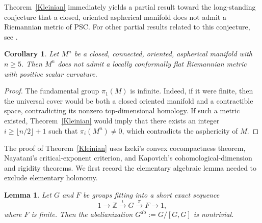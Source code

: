 \documentclass[12pt,oneside,a4paper]{article}
\theoremstyle{mytheorem}
\newtheorem{lemma}[definition]{Lemma}
\newtheorem{corollary}[definition]{Corollary}
\theoremstyle{remark}
\theoremstyle{definition}
\begin{document}
Theorem~\ref{Kleinian} immediately yields a partial result toward the long-standing conjecture that a closed, oriented aspherical manifold does not admit a Riemannian metric of PSC.
For other partial results related to this conjecture, see \cite{zbMATH07375613}.


\begin{corollary}\label{LCF aspherical}
Let \( M^n \) be a closed, connected, oriented, aspherical manifold with \( n \geq 5 \).
Then \( M^n \) does not admit a locally conformally flat Riemannian metric with positive scalar curvature.
\end{corollary}

\begin{proof}
The fundamental group \(\pi_1(M)\) is infinite. Indeed, if it were finite,
then the universal cover would be both a closed oriented manifold and a
contractible space, contradicting its nonzero top-dimensional homology.
If such a metric existed, Theorem~\ref{Kleinian} would imply that there exists
an integer $i\geq\lfloor n/2\rfloor+1$ such that
\(\pi_i(M^n)\neq0\), which contradicts the asphericity of \(M\).
\end{proof}



The proof of Theorem~\ref{Kleinian} uses Izeki's convex cocompactness theorem, Nayatani's critical-exponent criterion, and Kapovich's cohomological-dimension and rigidity theorems. We first record the elementary algebraic lemma needed to exclude elementary holonomy.

\begin{lemma}\label{Abel}
Let $G$ and $F$ be groups fitting into a short exact sequence
\[
1 \longrightarrow \mathbb{Z} \xrightarrow{\;\iota\;} G \xrightarrow{\;\pi\;} F \longrightarrow 1,
\]
where $F$ is finite. Then the abelianization $G^{\mathrm{ab}} := G/[G,G]$ is nontrivial.
\end{lemma}
\end{document}
